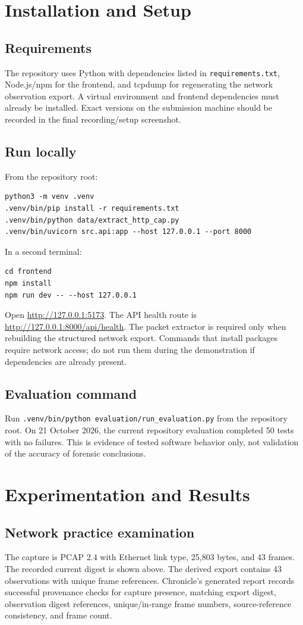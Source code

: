 \documentclass[12pt,a4paper]{report}
\begin{document}
\chapter{Installation and Setup}
\section{Requirements}
The repository uses Python with dependencies listed in \texttt{requirements.txt}, Node.js/npm for the frontend, and tcpdump for regenerating the network observation export. A virtual environment and frontend dependencies must already be installed. Exact versions on the submission machine should be recorded in the final recording/setup screenshot.

\section{Run locally}
From the repository root:
\begin{verbatim}
python3 -m venv .venv
.venv/bin/pip install -r requirements.txt
.venv/bin/python data/extract_http_cap.py
.venv/bin/uvicorn src.api:app --host 127.0.0.1 --port 8000
\end{verbatim}
In a second terminal:
\begin{verbatim}
cd frontend
npm install
npm run dev -- --host 127.0.0.1
\end{verbatim}
Open \url{http://127.0.0.1:5173}. The API health route is \url{http://127.0.0.1:8000/api/health}. The packet extractor is required only when rebuilding the structured network export. Commands that install packages require network access; do not run them during the demonstration if dependencies are already present.

\section{Evaluation command}
Run \texttt{.venv/bin/python evaluation/run\_evaluation.py} from the repository root. On 21 October 2026, the current repository evaluation completed 50 tests with no failures. This is evidence of tested software behavior only, not validation of the accuracy of forensic conclusions.

\chapter{Experimentation and Results}
\section{Network practice examination}
The capture is PCAP 2.4 with Ethernet link type, 25,803 bytes, and 43 frames. The recorded current digest is shown above. The derived export contains 43 observations with unique frame references. Chronicle's generated report records successful provenance checks for capture presence, matching export digest, observation digest references, unique/in-range frame numbers, source-reference consistency, and frame count.
\end{document}
